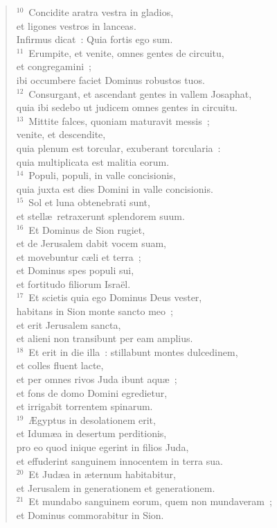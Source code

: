 \begin{verse}
${}^{10}$~Concidite aratra vestra in gladios,\\ et ligones vestros in lanceas.\\ Infirmus dicat~: Quia fortis ego sum.\\
${}^{11}$~Erumpite, et venite, omnes gentes de circuitu,\\ et congregamini~;\\ ibi occumbere faciet Dominus robustos tuos.\\
${}^{12}$~Consurgant, et ascendant gentes in vallem Josaphat,\\ quia ibi sedebo ut judicem omnes gentes in circuitu.\\
${}^{13}$~Mittite falces, quoniam maturavit messis~;\\ venite, et descendite,\\ quia plenum est torcular, exuberant torcularia~:\\ quia multiplicata est malitia eorum.\\
${}^{14}$~Populi, populi, in valle concisionis,\\ quia juxta est dies Domini in valle concisionis.\\
${}^{15}$~Sol et luna obtenebrati sunt,\\ et stell\ae\ retraxerunt splendorem suum.\\
${}^{16}$~Et Dominus de Sion rugiet,\\ et de Jerusalem dabit vocem suam,\\ et movebuntur c\ae li et terra~;\\ et Dominus spes populi sui,\\ et fortitudo filiorum Isra\"el.\\
${}^{17}$~Et scietis quia ego Dominus Deus vester,\\ habitans in Sion monte sancto meo~;\\ et erit Jerusalem sancta,\\ et alieni non transibunt per eam amplius.\\
${}^{18}$~Et erit in die illa~: stillabunt montes dulcedinem,\\ et colles fluent lacte,\\ et per omnes rivos Juda ibunt aqu\ae~;\\ et fons de domo Domini egredietur,\\ et irrigabit torrentem spinarum.\\
${}^{19}$~\AE gyptus in desolationem erit,\\ et Idum\ae a in desertum perditionis,\\ pro eo quod inique egerint in filios Juda,\\ et effuderint sanguinem innocentem in terra sua.\\
${}^{20}$~Et Jud\ae a in \ae ternum habitabitur,\\ et Jerusalem in generationem et generationem.\\
${}^{21}$~Et mundabo sanguinem eorum, quem non mundaveram~;\\ et Dominus commorabitur in Sion.\end{verse}


